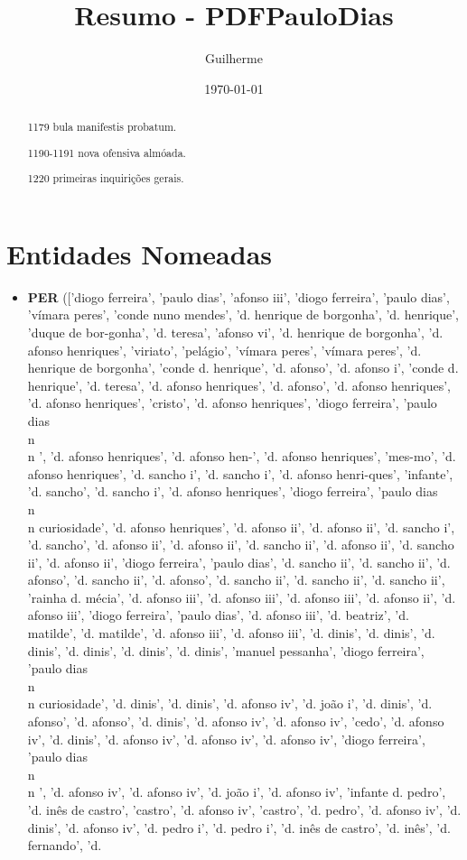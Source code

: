 \documentclass{article}
\title{Resumo - PDFPauloDias}
\author{Guilherme}
\date{\today}
\begin{document}
\maketitle

\begin{abstract}
1179 bula manifestis probatum.

1190-1191 nova ofensiva almóada.

1220 primeiras inquirições gerais.

\end{abstract}

\section{Entidades Nomeadas}
\begin{itemize}
\item \textbf{PER} (['diogo ferreira', 'paulo dias', 'afonso iii', 'diogo ferreira', 'paulo dias', 'vímara peres', 'conde nuno mendes', 'd. henrique de borgonha', 'd. henrique', 'duque de bor-gonha', 'd. teresa', 'afonso vi', 'd. henrique de borgonha', 'd. afonso henriques', 'viriato', 'pelágio', 'vímara peres', 'vímara peres', 'd. henrique de borgonha', 'conde d. henrique', 'd. afonso', 'd. afonso i', 'conde d. henrique', 'd. teresa', 'd. afonso henriques', 'd. afonso', 'd. afonso henriques', 'd. afonso henriques', 'cristo', 'd. afonso henriques', 'diogo ferreira', 'paulo dias\\n\\n ', 'd. afonso henriques', 'd. afonso hen-', 'd. afonso henriques', 'mes-mo', 'd. afonso henriques', 'd. sancho i', 'd. sancho i', 'd. afonso henri-ques', 'infante', 'd. sancho', 'd. sancho i', 'd. afonso henriques', 'diogo ferreira', 'paulo dias\\n\\n curiosidade', 'd. afonso henriques', 'd. afonso ii', 'd. afonso ii', 'd. sancho i', 'd. sancho', 'd. afonso ii', 'd. afonso ii', 'd. sancho ii', 'd. afonso ii', 'd. sancho ii', 'd. afonso ii', 'diogo ferreira', 'paulo dias', 'd. sancho ii', 'd. sancho ii', 'd. afonso', 'd. sancho ii', 'd. afonso', 'd. sancho ii', 'd. sancho ii', 'd. sancho ii', 'rainha d. mécia', 'd. afonso iii', 'd. afonso iii', 'd. afonso iii', 'd. afonso ii', 'd. afonso iii', 'diogo ferreira', 'paulo dias', 'd. afonso iii', 'd. beatriz', 'd. matilde', 'd. matilde', 'd. afonso iii', 'd. afonso iii', 'd. dinis', 'd. dinis', 'd. dinis', 'd. dinis', 'd. dinis', 'd. dinis', 'manuel pessanha', 'diogo ferreira', 'paulo dias\\n\\n curiosidade', 'd. dinis', 'd. dinis', 'd. afonso iv', 'd. joão i', 'd. dinis', 'd. afonso', 'd. afonso', 'd. dinis', 'd. afonso iv', 'd. afonso iv', 'cedo', 'd. afonso iv', 'd. dinis', 'd. afonso iv', 'd. afonso iv', 'd. afonso iv', 'diogo ferreira', 'paulo dias\\n\\n ', 'd. afonso iv', 'd. afonso iv', 'd. joão i', 'd. afonso iv', 'infante d. pedro', 'd. inês de castro', 'castro', 'd. afonso iv', 'castro', 'd. pedro', 'd. afonso iv', 'd. dinis', 'd. afonso iv', 'd. pedro i', 'd. pedro i', 'd. inês de castro', 'd. inês', 'd. fernando', 'd. 
\end{itemize}
\end{document}
